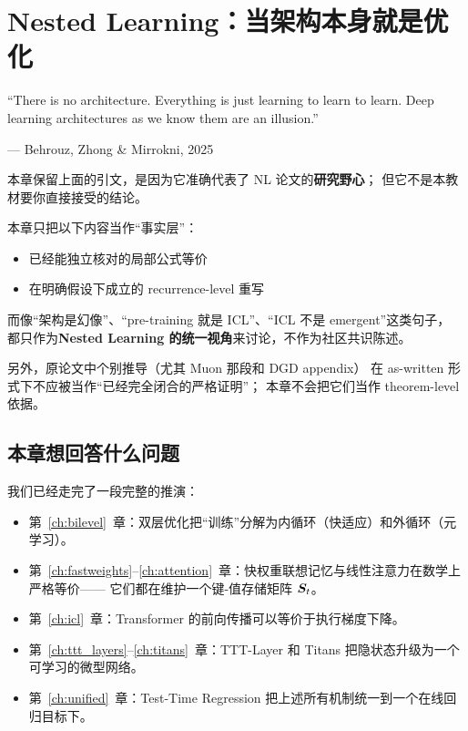 \chapter{Nested Learning：当架构本身就是优化}
\label{ch:nested}

\epigraph{``There is no architecture. Everything is just learning to learn to learn.
Deep learning architectures as we know them are an illusion.''}{--- Behrouz, Zhong \& Mirrokni, 2025}

\begin{viewpointbox}[title=开篇提醒：这句口号不是本章的定理]
本章保留上面的引文，是因为它准确代表了 NL 论文的\textbf{研究野心}；
但它不是本教材要你直接接受的结论。

本章只把以下内容当作``事实层''：
\begin{itemize}
  \item 已经能独立核对的局部公式等价
  \item 在明确假设下成立的 recurrence-level 重写
\end{itemize}

而像``架构是幻像''、``pre-training 就是 ICL''、``ICL 不是 emergent''这类句子，
都只作为\textbf{Nested Learning 的统一视角}来讨论，不作为社区共识陈述。

另外，原论文中个别推导（尤其 Muon 那段和 DGD appendix）
在 as-written 形式下不应被当作``已经完全闭合的严格证明''；
本章不会把它们当作 theorem-level 依据。
\end{viewpointbox}

\section{本章想回答什么问题}
\label{sec:nested_question}

我们已经走完了一段完整的推演：
\begin{itemize}
  \item 第~\ref{ch:bilevel}~章：双层优化把``训练''分解为内循环（快适应）和外循环（元学习）。
  \item 第~\ref{ch:fastweights}--\ref{ch:attention}~章：快权重联想记忆与线性注意力在数学上严格等价——
        它们都在维护一个键-值存储矩阵 $\boldsymbol{S}_t$。
  \item 第~\ref{ch:icl}~章：Transformer 的前向传播可以等价于执行梯度下降。
  \item 第~\ref{ch:ttt_layers}--\ref{ch:titans}~章：TTT-Layer 和 Titans
        把隐状态升级为一个可学习的微型网络。
  \item 第~\ref{ch:unified}~章：Test-Time Regression
        把上述所有机制统一到一个在线回归目标下。
\end{itemize}

